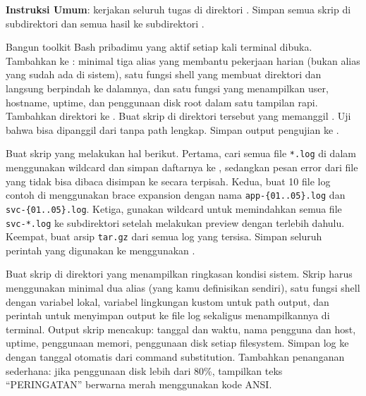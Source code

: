 \textbf{Instruksi Umum}: kerjakan seluruh tugas di direktori
. Simpan semua skrip di subdirektori
 dan semua hasil ke subdirektori .

\begin{exercisebox}
Bangun toolkit Bash pribadimu yang aktif setiap kali terminal dibuka.
Tambahkan ke : minimal tiga alias yang membantu pekerjaan
harian (bukan alias yang sudah ada di sistem), satu fungsi shell
 yang membuat direktori dan langsung berpindah ke dalamnya,
dan satu fungsi  yang menampilkan user, hostname,
uptime, dan penggunaan disk root dalam satu tampilan rapi. Tambahkan
direktori  ke . Buat skrip
 di direktori tersebut yang memanggil
. Uji bahwa  bisa dipanggil dari
 tanpa path lengkap. Simpan output pengujian ke
.
\end{exercisebox}

\begin{exercisebox}
Buat skrip  yang melakukan hal berikut. Pertama, cari
semua file \texttt{*.log} di dalam  menggunakan wildcard
dan simpan daftarnya ke , sedangkan pesan
error dari file yang tidak bisa dibaca disimpan ke 
secara terpisah. Kedua, buat 10 file log contoh di
 menggunakan brace expansion dengan nama
\texttt{app-\{01..05\}.log} dan \texttt{svc-\{01..05\}.log}. Ketiga,
gunakan wildcard untuk memindahkan semua file \texttt{svc-*.log} ke
subdirektori  setelah melakukan preview dengan 
terlebih dahulu. Keempat, buat arsip \texttt{tar.gz} dari semua log yang
tersisa. Simpan seluruh perintah yang digunakan ke
 menggunakan .
\end{exercisebox}

\begin{exercisebox}
Buat skrip  di direktori  yang menampilkan
ringkasan kondisi sistem. Skrip harus menggunakan minimal dua alias
(yang kamu definisikan sendiri), satu fungsi shell dengan variabel lokal,
variabel lingkungan kustom untuk path output, dan perintah 
untuk menyimpan output ke file log sekaligus menampilkannya di terminal.
Output skrip mencakup: tanggal dan waktu, nama pengguna dan host, uptime,
penggunaan memori, penggunaan disk setiap filesystem. Simpan log ke
 dengan tanggal otomatis dari
command substitution. Tambahkan penanganan sederhana: jika penggunaan
disk lebih dari 80\%, tampilkan teks ``PERINGATAN'' berwarna merah
menggunakan kode ANSI.
\end{exercisebox}

